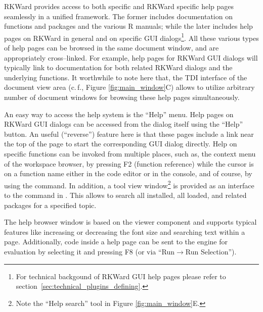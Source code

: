 RKWard provides access to both   specific and 
RKWard specific help pages seamlessly in a unified framework. 
The former includes documentation on  functions and packages 
and the various R manuals; while the later includes help pages on 
RKWard in general and on specific GUI dialogs\footnote{For technical 
backgound of RKWard GUI help pages please refer to section~\ref{sec:technical_plugins_defining}.}. 
All these various types of help pages can be browsed in the same document 
window, and are appropriately cross--linked. For example, help pages for
RKWard GUI dialogs will typically link to documentation for both
related RKWard dialogs and the underlying  functions.
It worthwhile to note here that, the TDI interface of the document view area 
(c.\,f., Figure \ref{fig:main_window}C) allows to utilize arbitrary number of document 
windows for browsing these help pages simultaneously.


An easy way to access the help system is the ``Help'' menu. Help pages on
RKWard GUI dialogs can be accessed from the dialog itself using the
``Help'' button. An useful (``reverse'') feature here is that these pages include 
a link near the top of the page to start the corresponding GUI dialog directly.
Help on  specific functions can be invoked from multiple places, 
such as, the context menu of the workspace browser, by pressing F2 (function
reference) while the cursor is on a function name either in the code editor or 
in the  console, and of course, by using the  
command. In addition, a tool view window\footnote{Note the ``Help search'' 
tool in Figure \ref{fig:main_window}E.} is provided as an interface to the
 command in . This allows to search all installed, 
all loaded, and related  packages for a specified topic.

The help browser window is based on the 
 viewer component and supports typical
features like increasing or decreasing the font size and searching text
within a page. Additionally,  code inside a help
page can be sent to the  engine for
evaluation by selecting it and pressing F8 (or via ``Run$\rightarrow$Run
Selection'').
